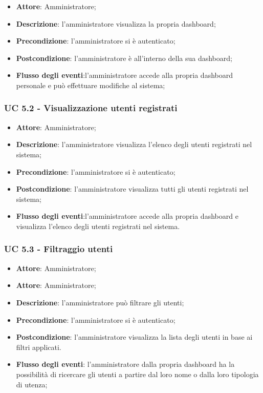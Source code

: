 \begin{itemize}
\item \textbf{Attore}: Amministratore; 
\item \textbf{Descrizione}: l'amministratore visualizza la propria dashboard;
\item \textbf{Precondizione}: l'amministratore si è autenticato;
\item \textbf{Postcondizione}: l'amministratore è all'interno della sua dashboard;
\item \textbf{Flusso degli eventi}:l'amministratore accede alla propria dashboard personale e può effettuare modifiche al sistema;
\end{itemize}

\subsubsection{UC 5.2 - Visualizzazione utenti registrati}

\begin{itemize}
\item \textbf{Attore}: Amministratore;
\item \textbf{Descrizione}: l'amministratore visualizza l'elenco degli utenti registrati nel sistema;
\item \textbf{Precondizione}:  l'amministratore si è autenticato;
\item \textbf{Postcondizione}: l'amministratore visualizza tutti gli utenti registrati nel sistema;
\item \textbf{Flusso degli eventi}:l'amministratore accede alla propria dashboard e visualizza l'elenco degli utenti registrati nel sistema.
\end{itemize}

\subsubsection{UC 5.3 - Filtraggio utenti}
\begin{itemize}
\item \textbf{Attore}: Amministratore;
\item \textbf{Attore}: Amministratore;
\item \textbf{Descrizione}: l'amministratore può filtrare gli utenti;
\item \textbf{Precondizione}: l'amministratore si è autenticato;
\item \textbf{Postcondizione}: l'amministratore visualizza la lista degli utenti in base ai filtri applicati.
\item \textbf{Flusso degli eventi}: l'amministratore dalla propria dashboard ha la possibilità di ricercare gli utenti a partire dal loro nome o dalla loro tipologia di utenza;
\end{itemize}

